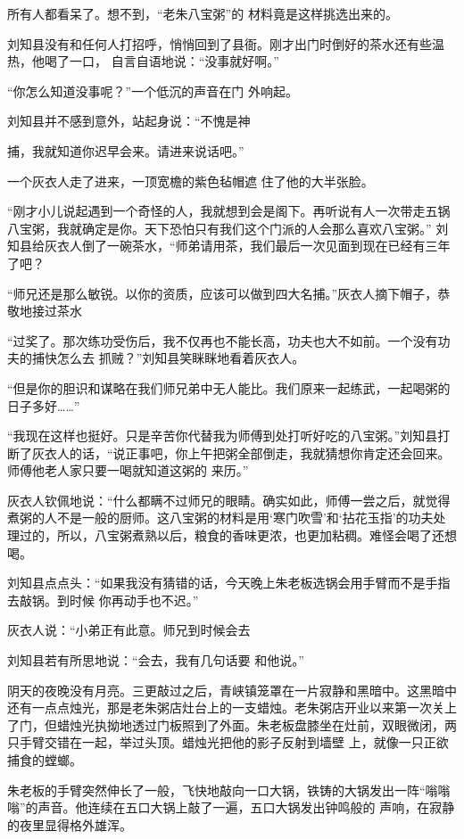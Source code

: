 \documentclass{article}
\begin{document}
所有人都看呆了。想不到，“老朱八宝粥”的
材料竟是这样挑选出来的。 

刘知县没有和任何人打招呼，悄悄回到了县衙。刚才出门时倒好的茶水还有些温热，他喝了一口，
自言自语地说：“没事就好啊。” 

“你怎么知道没事呢？”一个低沉的声音在门
外响起。 

刘知县并不感到意外，站起身说：“不愧是神
\newpage

捕，我就知道你迟早会来。请进来说话吧。” 

一个灰衣人走了进来，一顶宽檐的紫色毡帽遮
住了他的大半张脸。 

“刚才小儿说起遇到一个奇怪的人，我就想到会是阁下。再听说有人一次带走五锅八宝粥，我就确定是你。天下恐怕只有我们这个门派的人会那么喜欢八宝粥。” 刘知县给灰衣人倒了一碗茶水，“师弟请用茶，我们最后一次见面到现在已经有三年了吧？

“师兄还是那么敏锐。以你的资质，应该可以做到四大名捕。”灰衣人摘下帽子，恭敬地接过茶水

“过奖了。那次练功受伤后，我不仅再也不能长高，功夫也大不如前。一个没有功夫的捕快怎么去
抓贼？”刘知县笑眯眯地看着灰衣人。 

“但是你的胆识和谋略在我们师兄弟中无人能比。我们原来一起练武，一起喝粥的日子多好……”

\newpage

“我现在这样也挺好。只是辛苦你代替我为师傅到处打听好吃的八宝粥。”刘知县打断了灰衣人的话，“说正事吧，你上午把粥全部倒走，我就猜想你肯定还会回来。师傅他老人家只要一喝就知道这粥的
来历。” 

灰衣人钦佩地说：“什么都瞒不过师兄的眼睛。确实如此，师傅一尝之后，就觉得煮粥的人不是一般的厨师。这八宝粥的材料是用‘寒门吹雪’和‘拈花玉指’的功夫处理过的，所以，八宝粥煮熟以后，粮食的香味更浓，也更加粘稠。难怪会喝了还想喝。

刘知县点点头：“如果我没有猜错的话，今天晚上朱老板选锅会用手臂而不是手指去敲锅。到时候
你再动手也不迟。” 

灰衣人说：“小弟正有此意。师兄到时候会去

刘知县若有所思地说：“会去，我有几句话要
和他说。” 

\newpage

阴天的夜晚没有月亮。三更敲过之后，青峡镇笼罩在一片寂静和黑暗中。这黑暗中还有一点点烛光，那是老朱粥店灶台上的一支蜡烛。老朱粥店开业以来第一次关上了门，但蜡烛光执拗地透过门板照到了外面。朱老板盘膝坐在灶前，双眼微闭，两只手臂交错在一起，举过头顶。蜡烛光把他的影子反射到墙壁
上，就像一只正欲捕食的螳螂。 

朱老板的手臂突然伸长了一般，飞快地敲向一口大锅，铁铸的大锅发出一阵“嗡嗡嗡”的声音。他连续在五口大锅上敲了一遍，五口大锅发出钟鸣般的
声响，在寂静的夜里显得格外雄浑。 
\end{document}
